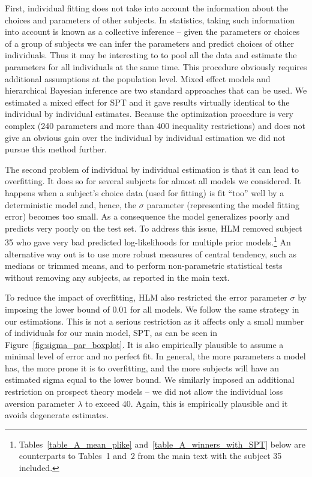 \documentclass[11pt, a4paper, oneside,final,notitlepage,onecolumn]{article}\usepackage[]{graphicx}\usepackage[]{color}
\begin{document}
First, individual fitting does not take into account the information about the choices and parameters of other subjects. In statistics, taking such information into account is known as a collective inference -- given the parameters or choices of a group of subjects we can infer the parameters and predict choices of other individuals. Thus it may be interesting to to pool all the data and estimate the parameters for all individuals at the same time. This procedure obviously requires additional assumptions at the population level. Mixed effect models and hierarchical Bayesian inference are two standard approaches that can be used. We estimated a mixed effect for SPT and it gave results  virtually identical to the individual by individual estimates. Because the optimization procedure is very complex (240 parameters and more than 400 inequality restrictions) and does not give an obvious gain over the individual by individual estimation we did not pursue this method further.

The second problem of individual by individual estimation is that it can lead to overfitting.  It does so for several subjects for almost all models we considered. It happens when a subject's choice data (used for fitting) is fit ``too'' well by a deterministic model and, hence, the $\sigma$ parameter (representing the model fitting error) becomes too small. As a consequence the model generalizes poorly and predicts very poorly on the test set. To address this issue, HLM removed subject 35 who gave very bad predicted log-likelihoods for multiple prior models.\footnote{Tables~\ref{table_A_mean_plike} and~\ref{table_A_winners_with_SPT} below are counterparts to Tables~1 and~2 from the main text with the subject 35 included.} An alternative way out is to use more robust measures of central tendency, such as medians or trimmed means, and to perform  non-parametric statistical tests without removing any subjects, as reported in the main text.  

To reduce the impact of overfitting, HLM also restricted the error parameter $\sigma$ by imposing the lower bound of $0.01$ for all models. We follow the same strategy in our estimations. This is not a serious restriction as it affects only a small number of individuals for our main model, SPT, as can be seen in Figure~\ref{fig:sigma_par_boxplot}. It is also empirically plausible to assume a minimal level of error and no perfect fit.  In general, the more parameters a model has, the more prone it is to overfitting, and the more subjects will have an estimated sigma equal to the lower bound.  We similarly imposed an additional restriction on prospect theory models
 -- we did not allow the individual loss aversion parameter $\lambda$ to exceed $40$.  Again, this is empirically plausible and it avoids degenerate estimates.
\end{document}
